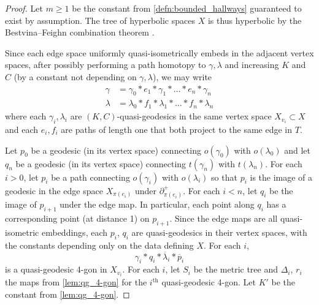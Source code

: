 \documentclass[11pt, a4paper]{amsart}
\theoremstyle{definition}
\begin{document}
\begin{proof}
Let $m\geqslant 1$ be the constant from \cref{defn:bounded_hallways} guaranteed to exist by assumption. The tree of hyperbolic spaces $X$ is thus hyperbolic by the Bestvina--Feighn combination theorem \cite{BF92}.

Since each edge space uniformly quasi-isometrically embeds in the adjacent vertex spaces, after possibly performing a path homotopy to $\gamma, \lambda$ and increasing $K$ and $C$ (by a constant not depending on $\gamma, \lambda$), we may write
\begin{align*}
\gamma &= \gamma_0*e_1*\gamma_1*\ldots*e_n*\gamma_n\\
\lambda &= \lambda_0*f_1*\lambda_1*\ldots*f_n*\lambda_n
\end{align*}
where each $\gamma_i, \lambda_i$ are $(K, C)$-quasi-geodesics in the same vertex space $X_{v_i}\subset X$ and each $e_i, f_i$ are paths of length one that both project to the same edge in $T$.



Let $p_0$ be a geodesic (in its vertex space) connecting $o(\gamma_0)$ with $o(\lambda_0)$ and let $q_n$ be a geodesic (in its vertex space) connecting $t(\gamma_n)$ with $t(\lambda_n)$. For each $i>0$, let $p_i$ be a path connecting $o(\gamma_i)$ with $o(\lambda_i)$ so that $p_i$ is the image of a geodesic in the edge space $X_{\pi(e_i)}$ under $\partial_{\pi(e_i)}^+$. For each $i<n$, let $q_i$ be the image of $p_{i+1}$ under the edge map. In particular, each point along $q_i$ has a corresponding point (at distance 1) on $p_{i+1}$. Since the edge maps are all quasi-isometric embeddings, each $p_i$, $q_i$ are quasi-geodesics in their vertex spaces, with the constants depending only on the data defining $X$. For each $i$,
\[
\gamma_i*q_i*\overline{\lambda}_i*\overline{p}_i
\]
is a quasi-geodesic 4-gon in $X_{v_i}$. For each $i$, let $S_i$ be the metric tree and $\Delta_i$, $r_i$ the maps from \cref{lem:qg_4-gon} for the $i^{\text{th}}$ quasi-geodesic 4-gon. Let $K'$ be the constant from \cref{lem:qg_4-gon}.


\end{proof}
\end{document}
